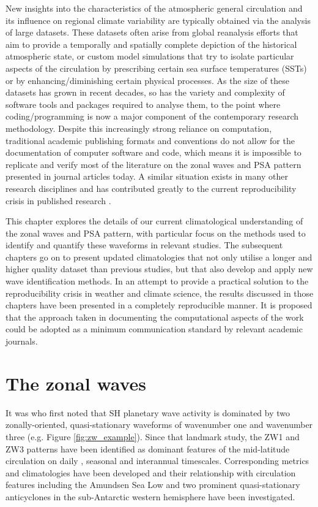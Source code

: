 New insights into the characteristics of the atmospheric general circulation and its influence on regional climate variability are typically obtained via the analysis of large datasets. These datasets often arise from global reanalysis efforts that aim to provide a temporally and spatially complete depiction of the historical atmospheric state, or custom model simulations that try to isolate particular aspects of the circulation by prescribing certain sea surface temperatures (SSTs) or by enhancing/diminishing certain physical processes. As the size of these datasets has grown in recent decades, so has the variety and complexity of software tools and packages required to analyse them, to the point where coding/programming is now a major component of the contemporary research methodology. Despite this increasingly strong reliance on computation, traditional academic publishing formats and conventions do not allow for the documentation of computer software and code, which means it is impossible to replicate and verify most of the literature on the zonal waves and PSA pattern presented in journal articles today. A similar situation exists in many other research disciplines and has contributed greatly to the current reproducibility crisis in published research \citep[e.g.][]{Peng2011}.

This chapter explores the details of our current climatological understanding of the zonal waves and PSA pattern, with particular focus on the methods used to identify and quantify these waveforms in relevant studies. The subsequent chapters go on to present updated climatologies that not only utilise a longer and higher quality dataset than previous studies, but that also develop and apply new wave identification methods. In an attempt to provide a practical solution to the reproducibility crisis in weather and climate science, the results discussed in those chapters have been presented in a completely reproducible manner. It is proposed that the approach taken in documenting the computational aspects of the work could be adopted as a minimum communication standard by relevant academic journals.


\section{The zonal waves}\label{s:zw_overview}

It was \citet{vanLoon1972} who first noted that SH planetary wave activity is dominated by two zonally-oriented, quasi-stationary waveforms of wavenumber one and wavenumber three (e.g. Figure \ref{fig:zw_example}). Since that landmark study, the ZW1 and ZW3 patterns have been identified as dominant features of the mid-latitude circulation on daily \citep[e.g.][]{Kidson1988}, seasonal \citep[e.g.][]{Mo1985} and interannual \citep[e.g.][]{Karoly1989} timescales. Corresponding metrics and climatologies have been developed \citep{Raphael2004,Hobbs2007} and their relationship with circulation features including the Amundsen Sea Low \citep[ASL;][]{Turner2013} and two prominent quasi-stationary anticyclones in the sub-Antarctic western hemisphere \citep{Hobbs2010} have been investigated.

